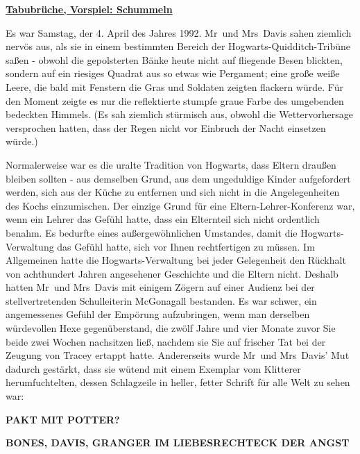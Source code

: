 

\hypertarget{tabubruxfcche-vorspiel-schummeln}{%

\textbf{\uline{Tabubrüche, Vorspiel: Schummeln}}

Es war Samstag, der 4. April des Jahres 1992. Mr~und Mrs~Davis sahen ziemlich nervös aus, als sie in einem bestimmten Bereich der Hogwarts-Quidditch-Tribüne saßen - obwohl die gepolsterten Bänke heute nicht auf fliegende Besen blickten, sondern auf ein riesiges Quadrat aus so etwas wie Pergament; eine große weiße Leere, die bald mit Fenstern die Gras und Soldaten zeigten flackern würde. Für den Moment zeigte es nur die reflektierte stumpfe graue Farbe des umgebenden bedeckten Himmels. (Es sah ziemlich stürmisch aus, obwohl die Wettervorhersage versprochen hatten, dass der Regen nicht vor Einbruch der Nacht einsetzen würde.)

Normalerweise war es die uralte Tradition von Hogwarts, dass Eltern draußen bleiben sollten - aus demselben Grund, aus dem ungeduldige Kinder aufgefordert werden, sich aus der Küche zu entfernen und sich nicht in die Angelegenheiten des Kochs einzumischen. Der einzige Grund für eine Eltern-Lehrer-Konferenz war, wenn ein Lehrer das Gefühl hatte, dass ein Elternteil sich nicht ordentlich benahm. Es bedurfte eines außergewöhnlichen Umstandes, damit die Hogwarts-Verwaltung das Gefühl hatte, sich vor Ihnen rechtfertigen zu müssen. Im Allgemeinen hatte die Hogwarts-Verwaltung bei jeder Gelegenheit den Rückhalt von achthundert Jahren angesehener Geschichte und die Eltern nicht. Deshalb hatten Mr~und Mrs~Davis mit einigem Zögern auf einer Audienz bei der stellvertretenden Schulleiterin McGonagall bestanden. Es war schwer, ein angemessenes Gefühl der Empörung aufzubringen, wenn man derselben würdevollen Hexe gegenüberstand, die zwölf Jahre und vier Monate zuvor Sie beide zwei Wochen nachsitzen ließ, nachdem sie Sie auf frischer Tat bei der Zeugung von Tracey ertappt hatte. Andererseits wurde Mr~und Mrs~Davis' Mut dadurch gestärkt, dass sie wütend mit einem Exemplar vom Klitterer herumfuchtelten, dessen Schlagzeile in heller, fetter Schrift für alle Welt zu sehen war:

\textbf{PAKT MIT POTTER?}

\textbf{BONES, DAVIS, GRANGER IM LIEBESRECHTECK DER ANGST}

}
